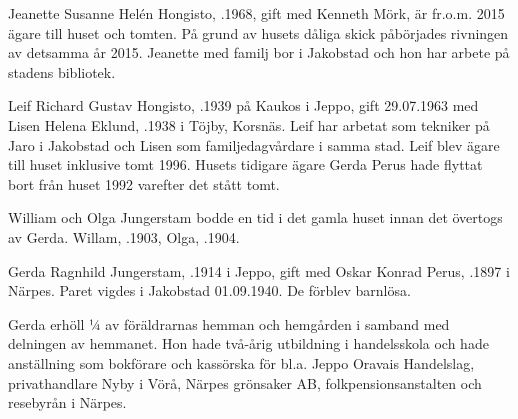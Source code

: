 Jeanette Susanne Helén Hongisto, .1968, gift med Kenneth Mörk, är fr.o.m. 2015 ägare till huset och tomten. På grund av husets dåliga skick påbörjades rivningen av detsamma år 2015. Jeanette med familj bor i Jakobstad och hon har arbete på stadens bibliotek.


Leif Richard Gustav Hongisto, .1939 på Kaukos i Jeppo, gift 29.07.1963 med Lisen Helena Eklund, .1938 i Töjby, Korsnäs. Leif har arbetat som tekniker på Jaro i Jakobstad och Lisen som familjedagvårdare i samma stad. Leif blev ägare till  huset inklusive tomt 1996. Husets tidigare ägare Gerda Perus hade flyttat bort från huset 1992 varefter det stått tomt.

William och Olga Jungerstam bodde en tid i det gamla huset innan det övertogs av Gerda. Willam, .1903, Olga, .1904.



Gerda Ragnhild Jungerstam, .1914 i Jeppo, gift med Oskar Konrad Perus, .1897 i Närpes. Paret vigdes i Jakobstad 01.09.1940. De förblev barnlösa.

Gerda erhöll ¼ av föräldrarnas hemman och hemgården i samband med delningen av hemmanet. Hon hade två-årig utbildning i handelsskola och hade anställning som bokförare och kassörska för bl.a. Jeppo Oravais Handelslag, privathandlare Nyby i Vörå, Närpes grönsaker AB, folkpensionsanstalten och resebyrån i Närpes.


